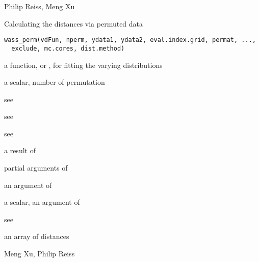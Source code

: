 \documentclass[a4paper]{book}
\begin{document}
%
\begin{Author}\relax
Philip Reiss, Meng Xu
\end{Author}
%
\begin{SeeAlso}\relax
{}
\end{SeeAlso}
%
\begin{Description}\relax
Calculating the distances via permuted data
\end{Description}
%
\begin{Usage}
\begin{verbatim}
wass_perm(vdFun, nperm, ydata1, ydata2, eval.index.grid, permat, ...,
  exclude, mc.cores, dist.method)
\end{verbatim}
\end{Usage}
%
\begin{Arguments}
\begin{ldescription}
\item[\code{vdFun}] a function,  or , for fitting the varying distributions

\item[\code{nperm}] a scalar, number of permutation

\item[\code{ydata1}] see 

\item[\code{ydata2}] see 

\item[\code{eval.index.grid}] see 

\item[\code{permat}] a result of 

\item[\code{...}] partial arguments of 

\item[\code{exclude}] an argument of 

\item[\code{mc.cores}] a scalar, an argument of 

\item[\code{dist.method}] see 
\end{ldescription}
\end{Arguments}
%
\begin{Value}
an array of distances
\end{Value}
%
\begin{Author}\relax
Meng Xu, Philip Reiss
\end{Author}
%
\begin{SeeAlso}\relax
{}
\end{SeeAlso}
\printindex{}
\end{document}
